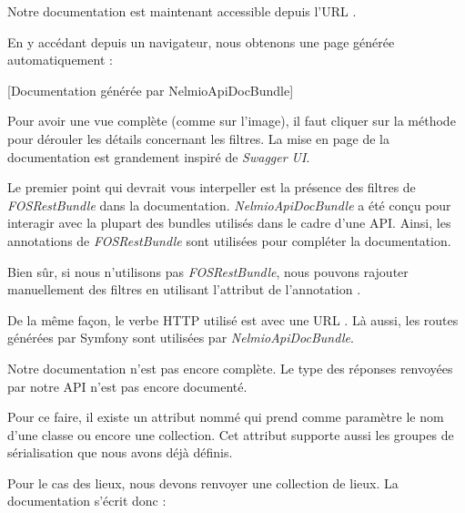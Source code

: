 \documentclass[big]{zmdocument}
\begin{document}
Notre documentation est maintenant accessible depuis l'URL .



En y accédant depuis un navigateur, nous obtenons une page générée automatiquement :



[Documentation générée par NelmioApiDocBundle]


Pour avoir une vue complète (comme sur l'image), il faut cliquer sur la méthode  pour dérouler les détails concernant les filtres. La mise en page de la documentation est grandement inspiré de \textit{Swagger UI}.





Le premier point qui devrait vous interpeller est la présence des filtres de \textit{FOSRestBundle} dans la documentation.
\textit{NelmioApiDocBundle} a été conçu pour interagir avec la plupart des bundles utilisés dans le cadre d'une API. 
Ainsi, les annotations de \textit{FOSRestBundle} sont utilisées pour compléter la documentation.



Bien sûr, si nous n'utilisons pas \textit{FOSRestBundle}, nous pouvons rajouter manuellement des filtres en utilisant l'attribut  de l'annotation .



De la même façon, le verbe HTTP utilisé est  avec une URL . Là aussi, les routes générées par Symfony sont utilisées par \textit{NelmioApiDocBundle}.





Notre documentation n'est pas encore complète. Le type des réponses renvoyées par notre API n'est pas encore documenté.



Pour ce faire, il existe un attribut nommé  qui prend comme paramètre le nom d'une classe ou encore une collection. Cet attribut supporte aussi les groupes de sérialisation que nous avons déjà définis.



Pour le cas des lieux, nous devons renvoyer une collection de lieux. La documentation s'écrit donc :
\end{document}
